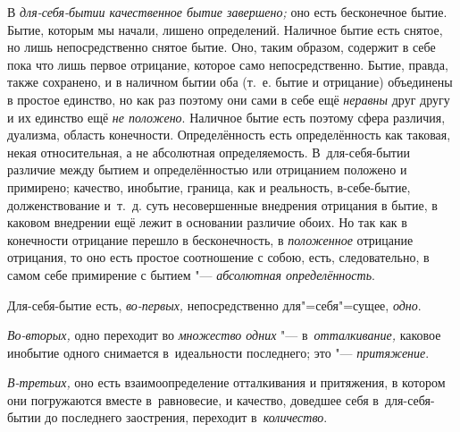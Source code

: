 В {\em для-себя-бытии качественное бытие завершено;} оно
есть бесконечное бытие. Бытие, которым мы начали, лишено определений.
Наличное бытие есть снятое, но лишь непосредственно снятое бытие. Оно,
таким образом, содержит в себе пока что лишь первое отрицание, которое само
непосредственно. Бытие, правда, также сохранено, и в наличном бытии оба
(т.~е. бытие и отрицание) объединены в простое единство, но как раз поэтому
они сами в себе ещё {\em неравны} друг другу и их
единство ещё {\em не положено}. Наличное бытие есть
поэтому сфера различия, дуализма, область конечности. Определённость
есть определённость как таковая, некая относительная, а не абсолютная
определяемость. В~для-себя-бытии различие между бытием и определённостью
или отрицанием положено и примирено; качество, инобытие, граница, как и
реальность, в-себе-бытие, долженствование и~т.~д. суть несовершенные
внедрения отрицания в бытие, в каковом внедрении ещё лежит в основании
различие обоих. Но так как в конечности отрицание перешло в бесконечность,
в {\em положенное} отрицание отрицания, то оно есть
простое соотношение с собою, есть, следовательно, в самом себе примирение с
бытием "--- {\em абсолютная определённость}.

Для-себя-бытие есть, {\em во-первых,} непосредственно
для"=себя"=сущее, {\em одно}.

{\em Во-вторых,} одно переходит во {\em множество одних} "---
в~{\em отталкивание,} каковое инобытие одного снимается
в~идеальности последнего; это "--- {\em притяжение}.

{\em В-третьих,} оно есть взаимоопределение отталкивания и притяжения,
в котором они погружаются вместе в~равновесие, и качество, доведшее себя
в~для-себя-бытии до последнего заострения, переходит в~{\em количество}.


